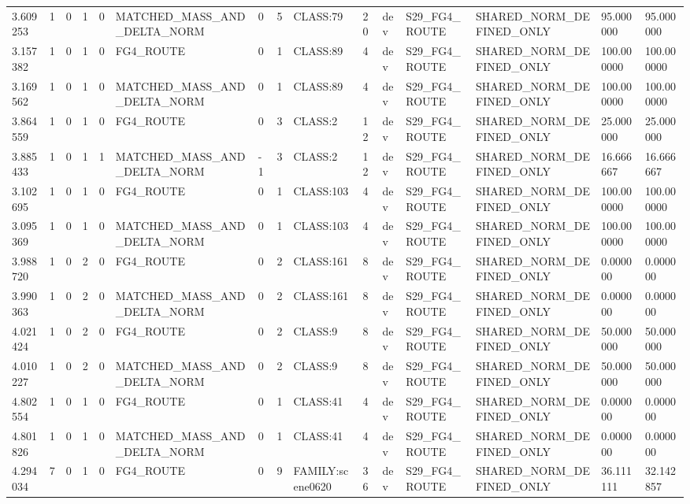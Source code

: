 \begin{tabular}{lllllllllllllll}
3.609253 & 1 & 0 & 1 & 0 & MATCHED\_MASS\_AND\_DELTA\_NORM & 0 & 5 & CLASS:79 & 20 & dev & S29\_FG4\_ROUTE & SHARED\_NORM\_DEFINED\_ONLY & 95.000000 & 95.000000 \\
3.157382 & 1 & 0 & 1 & 0 & FG4\_ROUTE & 0 & 1 & CLASS:89 & 4 & dev & S29\_FG4\_ROUTE & SHARED\_NORM\_DEFINED\_ONLY & 100.000000 & 100.000000 \\
3.169562 & 1 & 0 & 1 & 0 & MATCHED\_MASS\_AND\_DELTA\_NORM & 0 & 1 & CLASS:89 & 4 & dev & S29\_FG4\_ROUTE & SHARED\_NORM\_DEFINED\_ONLY & 100.000000 & 100.000000 \\
3.864559 & 1 & 0 & 1 & 0 & FG4\_ROUTE & 0 & 3 & CLASS:2 & 12 & dev & S29\_FG4\_ROUTE & SHARED\_NORM\_DEFINED\_ONLY & 25.000000 & 25.000000 \\
3.885433 & 1 & 0 & 1 & 1 & MATCHED\_MASS\_AND\_DELTA\_NORM & -1 & 3 & CLASS:2 & 12 & dev & S29\_FG4\_ROUTE & SHARED\_NORM\_DEFINED\_ONLY & 16.666667 & 16.666667 \\
3.102695 & 1 & 0 & 1 & 0 & FG4\_ROUTE & 0 & 1 & CLASS:103 & 4 & dev & S29\_FG4\_ROUTE & SHARED\_NORM\_DEFINED\_ONLY & 100.000000 & 100.000000 \\
3.095369 & 1 & 0 & 1 & 0 & MATCHED\_MASS\_AND\_DELTA\_NORM & 0 & 1 & CLASS:103 & 4 & dev & S29\_FG4\_ROUTE & SHARED\_NORM\_DEFINED\_ONLY & 100.000000 & 100.000000 \\
3.988720 & 1 & 0 & 2 & 0 & FG4\_ROUTE & 0 & 2 & CLASS:161 & 8 & dev & S29\_FG4\_ROUTE & SHARED\_NORM\_DEFINED\_ONLY & 0.000000 & 0.000000 \\
3.990363 & 1 & 0 & 2 & 0 & MATCHED\_MASS\_AND\_DELTA\_NORM & 0 & 2 & CLASS:161 & 8 & dev & S29\_FG4\_ROUTE & SHARED\_NORM\_DEFINED\_ONLY & 0.000000 & 0.000000 \\
4.021424 & 1 & 0 & 2 & 0 & FG4\_ROUTE & 0 & 2 & CLASS:9 & 8 & dev & S29\_FG4\_ROUTE & SHARED\_NORM\_DEFINED\_ONLY & 50.000000 & 50.000000 \\
4.010227 & 1 & 0 & 2 & 0 & MATCHED\_MASS\_AND\_DELTA\_NORM & 0 & 2 & CLASS:9 & 8 & dev & S29\_FG4\_ROUTE & SHARED\_NORM\_DEFINED\_ONLY & 50.000000 & 50.000000 \\
4.802554 & 1 & 0 & 1 & 0 & FG4\_ROUTE & 0 & 1 & CLASS:41 & 4 & dev & S29\_FG4\_ROUTE & SHARED\_NORM\_DEFINED\_ONLY & 0.000000 & 0.000000 \\
4.801826 & 1 & 0 & 1 & 0 & MATCHED\_MASS\_AND\_DELTA\_NORM & 0 & 1 & CLASS:41 & 4 & dev & S29\_FG4\_ROUTE & SHARED\_NORM\_DEFINED\_ONLY & 0.000000 & 0.000000 \\
4.294034 & 7 & 0 & 1 & 0 & FG4\_ROUTE & 0 & 9 & FAMILY:scene0620 & 36 & dev & S29\_FG4\_ROUTE & SHARED\_NORM\_DEFINED\_ONLY & 36.111111 & 32.142857 \\

\end{tabular}
